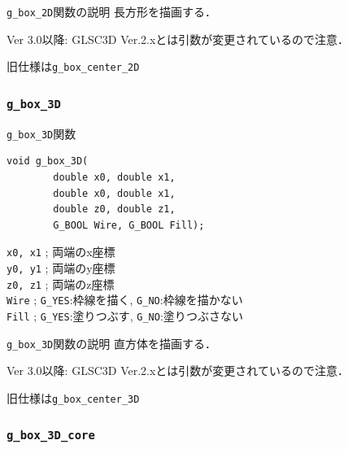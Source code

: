 \documentclass[platex,a4paper,12pt]{jsarticle}%
\begin{document}
\begin{itembox}[l]{\texttt{g\_box\_2D}関数の説明}
長方形を描画する．

Ver 3.0以降: GLSC3D Ver.2.xとは引数が変更されているので注意．

旧仕様は\verb|g_box_center_2D|
\end{itembox}


\subsubsection{\texttt{g\_box\_3D}}

\begin{itembox}[l]{\texttt{g\_box\_3D}関数}
\begin{verbatim}
void g_box_3D(
        double x0, double x1,
        double x0, double x1,
        double z0, double z1,
        G_BOOL Wire, G_BOOL Fill);   
\end{verbatim}
\verb|x0, x1| ; 両端のx座標\\
\verb|y0, y1| ; 両端のy座標\\
\verb|z0, z1| ; 両端のz座標\\
\verb|Wire| ; \verb|G_YES|:枠線を描く, \verb|G_NO|:枠線を描かない \\
\verb|Fill| ; \verb|G_YES|:塗りつぶす, \verb|G_NO|:塗りつぶさない
\end{itembox}

\begin{itembox}[l]{\texttt{g\_box\_3D}関数の説明}
直方体を描画する．

Ver 3.0以降: GLSC3D Ver.2.xとは引数が変更されているので注意．

旧仕様は\verb|g_box_center_3D|
\end{itembox}

\subsubsection{\texttt{g\_box\_3D\_core}}
\end{document}
